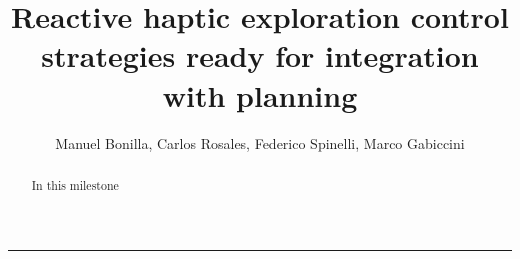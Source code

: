 \documentclass[a4paper,11pt,pdf]{pacmanreport}
\title{Reactive haptic exploration control strategies ready for integration with planning}
\author{Manuel Bonilla, Carlos Rosales, Federico Spinelli, Marco Gabiccini}
\begin{document}
\maketitle

\begin{abstract}
\noindent In  this milestone 
\end{abstract}


\vspace{.2em}
\hrule

\vspace{.2em}
\footnotesize

\tableofcontents

\normalsize

\newpage






















\end{document}
